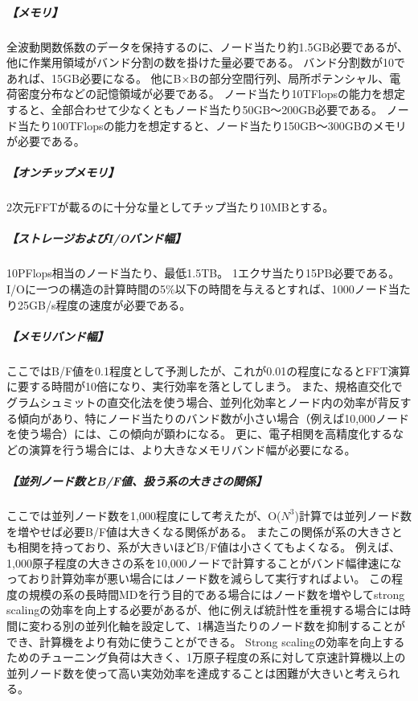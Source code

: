\subparagraph{【メモリ】}
全波動関数係数のデータを保持するのに、ノード当たり約1.5GB必要であるが、他に作業用領域がバンド分割の数を掛けた量必要である。
バンド分割数が10であれば、15GB必要になる。
他にB×Bの部分空間行列、局所ポテンシャル、電荷密度分布などの記憶領域が必要である。
ノード当たり10TFlopsの能力を想定すると、全部合わせて少なくともノード当たり50GB～200GB必要である。
ノード当たり100TFlopsの能力を想定すると、ノード当たり150GB～300GBのメモリが必要である。

\subparagraph{【オンチップメモリ】}
2次元FFTが載るのに十分な量としてチップ当たり10MBとする。

\subparagraph{【ストレージおよびI/Oバンド幅】}
10PFlops相当のノード当たり、最低1.5TB。
1エクサ当たり15PB必要である。I/Oに一つの構造の計算時間の5\%以下の時間を与えるとすれば、1000ノード当たり25GB/s程度の速度が必要である。

\subparagraph{【メモリバンド幅】}
ここではB/F値を0.1程度として予測したが、これが0.01の程度になるとFFT演算に要する時間が10倍になり、実行効率を落としてしまう。
また、規格直交化でグラムシュミットの直交化法を使う場合、並列化効率とノード内の効率が背反する傾向があり、特にノード当たりのバンド数が小さい場合（例えば10,000ノードを使う場合）には、この傾向が顕わになる。
更に、電子相関を高精度化するなどの演算を行う場合には、より大きなメモリバンド幅が必要になる。

\subparagraph{【並列ノード数とB/F値、扱う系の大きさの関係】}
ここでは並列ノード数を1,000程度にして考えたが、O($N^3$)計算では並列ノード数を増やせば必要B/F値は大きくなる関係がある。
またこの関係が系の大きさとも相関を持っており、系が大きいほどB/F値は小さくてもよくなる。
例えば、1,000原子程度の大きさの系を10,000ノードで計算することがバンド幅律速になっており計算効率が悪い場合にはノード数を減らして実行すればよい。
この程度の規模の系の長時間MDを行う目的である場合にはノード数を増やしてstrong scalingの効率を向上する必要があるが、他に例えば統計性を重視する場合には時間に変わる別の並列化軸を設定して、1構造当たりのノード数を抑制することができ、計算機をより有効に使うことができる。
Strong scalingの効率を向上するためのチューニング負荷は大きく、1万原子程度の系に対して京速計算機以上の並列ノード数を使って高い実効効率を達成することは困難が大きいと考えられる。


